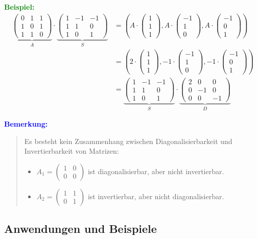 \documentclass{article}
\newcommand{\blue}[1]{\textcolor{blue}{#1}}
\newcommand{\green}[1]{\textcolor{green}{#1}}
\newcommand{\ex}{\green{\textbf{Beispiel: }}}
\newcommand{\an}[1]{\blue{\textbf{Bemerkung: }}\begin{quote}#1\end{quote}}
\newcommand{\vvvec}[3]{\begin{pmatrix}#1\\#2\\#3\end{pmatrix}}
\begin{document}
\ex 
\begin{align*}
        \underbrace{\begin{pmatrix}
        0 & 1 & 1\\
        1 & 0 & 1\\
        1 & 1 & 0
    \end{pmatrix}}_A \cdot \underbrace{\begin{pmatrix}
        1 & -1 & -1\\
        1 & 1 & 0\\
        1 & 0 & 1
    \end{pmatrix}}_S &= (A \cdot \vvvec{1}{1}{1}, A \cdot \vvvec{-1}{1}{0}, A \cdot \vvvec{-1}{0}{1})\\
    &= (2 \cdot \vvvec{1}{1}{1}, -1 \cdot \vvvec{-1}{1}{0}, -1 \cdot \vvvec{-1}{0}{1})\\
    &= \underbrace{\begin{pmatrix}
        1 & -1 & -1\\
        1 & 1 & 0\\
        1 & 0 & 1
    \end{pmatrix}}_S \cdot \underbrace{\begin{pmatrix}
        2 & 0 & 0\\
        0 & -1 & 0\\
        0 & 0 & -1
    \end{pmatrix}}_D 
\end{align*}

\an{
    Es besteht kein Zusammenhang zwischen Diagonalisierbarkeit und Invertierbarkeit von Matrizen:
    \begin{itemize}
        \item $A_1 = \begin{pmatrix}
            1 & 0\\
            0 & 0
        \end{pmatrix}$ ist diagonalisierbar, aber nicht invertierbar.
        \item $A_2 = \begin{pmatrix}
            1 & 1\\
            0 & 1
        \end{pmatrix}$ ist invertierbar, aber nicht diagonalisierbar.
    \end{itemize}
}

\subsection{Anwendungen und Beispiele}
\end{document}
